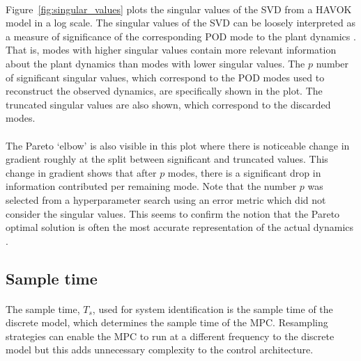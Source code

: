         

        \paragraph{}
        Figure~\ref{fig:singular_values} plots the singular values of the SVD from a HAVOK model in a log scale.
        The singular values of the SVD can be loosely interpreted as 
        a measure of significance of the corresponding POD mode to the plant dynamics \cite{Brunton2019d}. 
        That is, modes with higher singular values contain more relevant information about the plant dynamics 
        than modes with lower singular values.
        The $p$ number of significant singular values, 
        which correspond to the POD modes used to reconstruct the observed dynamics,
        are specifically shown in the plot.
        The truncated singular values are also shown, which correspond to the discarded modes.
        
        \paragraph{}
        The Pareto `elbow' is also visible in this plot where there is noticeable change in gradient
        roughly at the split between significant and truncated values.
        This change in gradient shows that after $p$ modes, 
        there is a significant drop in information contributed per remaining mode.
        Note that the number $p$ was selected from a hyperparameter search using an error metric
        which did not consider the singular values.
        This seems to confirm the notion that the Pareto optimal solution 
        is often the most accurate representation of the actual dynamics \cite{Brunton2019d}.

    \subsection{Sample time}

        \paragraph{}
        The sample time, $T_s$, used for system identification is the sample time of the discrete model, 
        which determines the sample time of the MPC.
        Resampling strategies can enable the MPC to run at a different frequency to the discrete model 
        but this adds unnecessary complexity to the control architecture.
        
